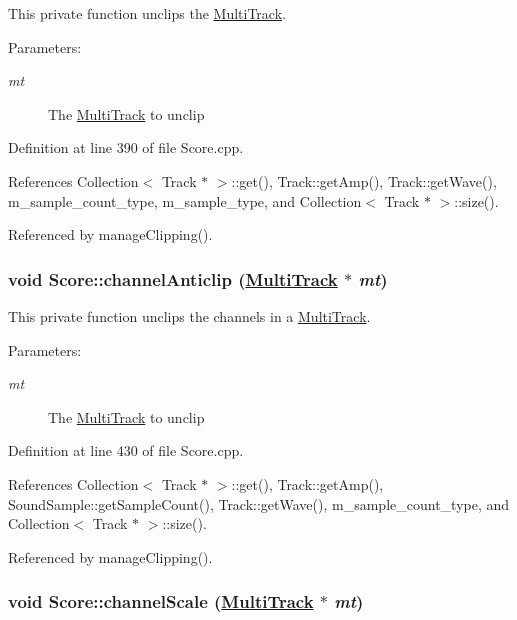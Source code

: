 This private function unclips the \hyperlink{classMultiTrack}{Multi\-Track}. \begin{Desc}
\item[Parameters:]
\begin{description}
\item[{\em mt}]The \hyperlink{classMultiTrack}{Multi\-Track} to unclip \end{description}
\end{Desc}


Definition at line 390 of file Score.cpp.

References Collection$<$ Track $\ast$ $>$::get(), Track::get\-Amp(), Track::get\-Wave(), m\_\-sample\_\-count\_\-type, m\_\-sample\_\-type, and Collection$<$ Track $\ast$ $>$::size().

Referenced by manage\-Clipping().\hypertarget{classScore_h4}{
\subsubsection[channelAnticlip]{\setlength{\rightskip}{0pt plus 5cm}void Score::channel\-Anticlip (\hyperlink{classMultiTrack}{Multi\-Track} $\ast$ {\em mt})}}
\label{classScore_h4}


This private function unclips the channels in a \hyperlink{classMultiTrack}{Multi\-Track}. \begin{Desc}
\item[Parameters:]
\begin{description}
\item[{\em mt}]The \hyperlink{classMultiTrack}{Multi\-Track} to unclip \end{description}
\end{Desc}


Definition at line 430 of file Score.cpp.

References Collection$<$ Track $\ast$ $>$::get(), Track::get\-Amp(), Sound\-Sample::get\-Sample\-Count(), Track::get\-Wave(), m\_\-sample\_\-count\_\-type, and Collection$<$ Track $\ast$ $>$::size().

Referenced by manage\-Clipping().\hypertarget{classScore_h2}{
\subsubsection[channelScale]{\setlength{\rightskip}{0pt plus 5cm}void Score::channel\-Scale (\hyperlink{classMultiTrack}{Multi\-Track} $\ast$ {\em mt})}}
\label{classScore_h2}


